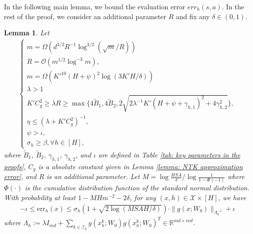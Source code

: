 \documentclass{article} \usepackage{iclr2023/iclr2023_conference,times}
\def\err{{\mathrm{err}}}
\newtheorem{lemma}{Lemma}[section]
\begin{document}
In the following main lemma, we bound the evaluation error $err_h(s,a)$. In the rest of the proof, we consider an additional parameter $R$ and fix any $\delta \in (0,1)$. 
\begin{lemma}
Let 
\begin{align}
\begin{cases}
m = \Omega \left( d^{3/2}  R^{-1} \log^{3/2} (\sqrt{m} /R) \right) \\
    R = \mathcal{O} \left( m^{1/2} \log^{-3} m \right), \\ 
m = \Omega \left( K'^{10} (H + \psi)^2 \log(3 K'H/\delta)\right) \\ 
    \lambda > 1 \\ 
    K' C_g^2 \geq \lambda 
R \geq \max\{ 4 \tilde{B}_1, 4 \tilde{B}_2, 2 \sqrt{2\lambda^{-1}K' (H + \psi + \gamma_{h,1})^2 + 4 \gamma_{h,2}^2} \}, \\
      \eta \leq (\lambda + K' C_g^2)^{-1}, \\
     \psi > \iota, \\
     \sigma_h \geq \beta, \forall h \in [H],
\end{cases}
\label{equation: conditions for R and eta final version and condition for psi and sigma}
\end{align}
where $\tilde{B}_1$, $\tilde{B}_2$, $\gamma_{h,1}$, $\gamma_{h,2}$, and $\iota$ are defined in Table \ref{tab: key parameters in the proofs}, $C_g$ is a absolute constant given in Lemma \ref{lemma: NTK approximation error}, and $R$ is an additional parameter.
Let $M = \log \frac{HSA}{\delta} / \log \frac{1}{1 - \Phi(-1)}$ where $\Phi(\cdot)$ is the cumulative distribution function of the standard normal distribution. With probability at least $1 -  MH m^{-2} - 2 \delta$, for any $(x,h) \in \mathcal{X} \times [H]$, we have 
\begin{align*}
    -\iota \leq \err_h(x) \leq \sigma_h(1 +  \sqrt{2 \log (M SAH / \delta)}  ) \cdot \| g(x; W_0) \|_{\Lambda_h^{-1}} + \iota 
\end{align*}
where $\Lambda_h := \lambda I_{md} + \sum_{k \in \mathcal{I}_h} g(x^k_h; W_0) g(x^k_h; W_0)^T \in \mathbb{R}^{md \times md }$. 
\label{lemma: bound of the evalulation error - main lemma}
\end{lemma}
\end{document}
